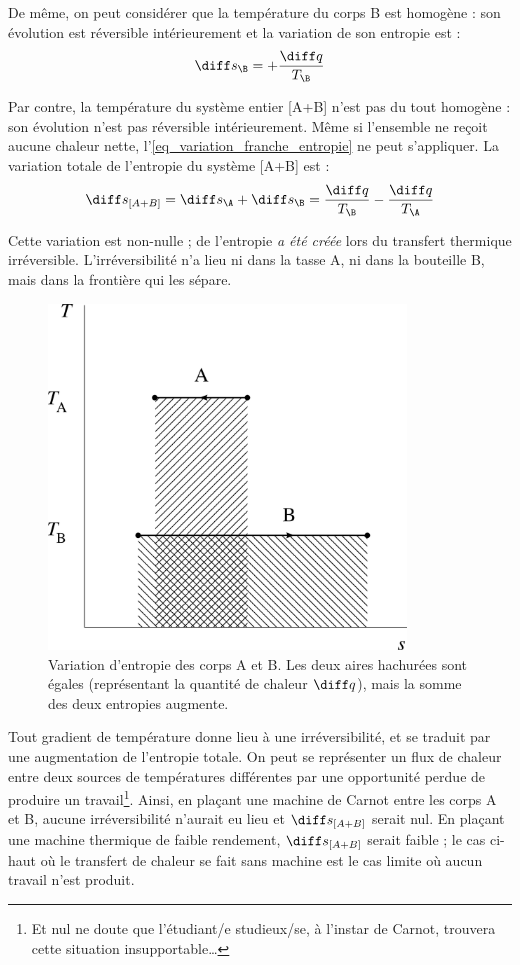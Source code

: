 		De même, on peut considérer que la température du corps B est homogène : son évolution est réversible intérieurement et la variation de son entropie est :
		\begin{equation*}
			\diff s_\B = + \frac{\diff q}{T_\B }
		\end{equation*}

		Par contre, la température du système entier [A+B] n’est pas du tout homogène : son évolution n’est pas réversible intérieurement. Même si l’ensemble ne reçoit aucune chaleur nette, l’\cref{eq_variation_franche_entropie} ne peut s’appliquer. La variation totale de l’entropie du système [A+B] est :
		\begin{equation}
			\diff s_{[A+B]} = \diff s_\A + \diff s_\B = \frac{\diff q}{T_\B } - \frac{\diff q}{T_\A}
		\end{equation}

		Cette variation est non-nulle ; de l’entropie \textit{a été créée} lors du transfert thermique irréversible. L’irréversibilité n’a lieu ni dans la tasse A, ni dans la bouteille B, mais dans la frontière qui les sépare.

		\begin{figure}
			\begin{center}
				\includegraphics[width=9.5cm]{images/ts_echange_chaleur.png}
			\end{center}
			\caption{Variation d’entropie des corps A et B.
		Les deux aires hachurées sont égales (représentant la quantité de chaleur $\diff q$), mais la somme des deux entropies augmente.}
			\label{fig_expérience_création_entropie_t-s}
		\end{figure}

		Tout gradient de température donne lieu à une irréversibilité, et se traduit par une augmentation de l’entropie totale. On peut se représenter un flux de chaleur entre deux sources de températures différentes par une opportunité perdue de produire un travail\footnote{Et nul ne doute que l’étudiant/e studieux/se, à l’instar de Carnot, trouvera cette situation insupportable…}.
		Ainsi, en plaçant une machine de Carnot entre les corps A et B, aucune irréversibilité n’aurait eu lieu et $\diff s_{[A+B]}$ serait nul. En plaçant une machine thermique de faible rendement, $\diff s_{[A+B]}$ serait faible ; le cas ci-haut où le transfert de chaleur se fait sans machine est le cas limite où aucun travail n’est produit.

